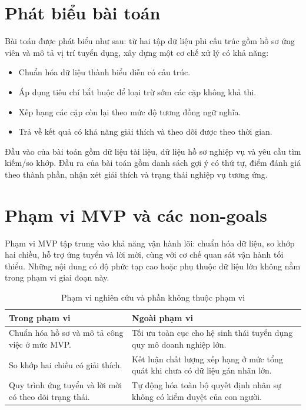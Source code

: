 \section{Phát biểu bài toán}

Bài toán được phát biểu như sau: từ hai tập dữ liệu phi cấu trúc gồm hồ sơ ứng viên và mô tả vị trí tuyển dụng, xây dựng một cơ chế xử lý có khả năng:

\begin{itemize}
  \item Chuẩn hóa dữ liệu thành biểu diễn có cấu trúc.
  \item Áp dụng tiêu chí bắt buộc để loại trừ sớm các cặp không khả thi.
  \item Xếp hạng các cặp còn lại theo mức độ tương đồng ngữ nghĩa.
  \item Trả về kết quả có khả năng giải thích và theo dõi được theo thời gian.
\end{itemize}

Đầu vào của bài toán gồm dữ liệu tài liệu, dữ liệu hồ sơ nghiệp vụ và yêu cầu tìm kiếm/so khớp. Đầu ra của bài toán gồm danh sách gợi ý có thứ tự, điểm đánh giá theo thành phần, nhận xét giải thích và trạng thái nghiệp vụ tương ứng.

\section{Phạm vi MVP và các non-goals}

Phạm vi MVP tập trung vào khả năng vận hành lõi: chuẩn hóa dữ liệu, so khớp hai chiều, hỗ trợ ứng tuyển và lời mời, cùng với cơ chế quan sát vận hành tối thiểu. Những nội dung có độ phức tạp cao hoặc phụ thuộc dữ liệu lớn không nằm trong phạm vi giai đoạn này.

\begin{table}[H]
\caption{Phạm vi nghiên cứu và phần không thuộc phạm vi}
\centering
\begin{tabularx}{\textwidth}{p{}p{}}
\toprule
\textbf{Trong phạm vi} & \textbf{Ngoài phạm vi}\\
\midrule
Chuẩn hóa hồ sơ và mô tả công việc ở mức MVP. & Tối ưu toàn cục cho hệ sinh thái tuyển dụng quy mô doanh nghiệp lớn.\\
So khớp hai chiều có giải thích. & Kết luận chất lượng xếp hạng ở mức tổng quát khi chưa có dữ liệu gán nhãn lớn.\\
Quy trình ứng tuyển và lời mời có theo dõi trạng thái. & Tự động hóa toàn bộ quyết định nhân sự không có kiểm duyệt của con người.\\
\bottomrule
\end{tabularx}
\end{table}

